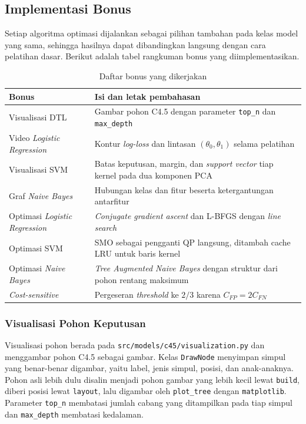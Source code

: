 \subsection{Implementasi Bonus}

Setiap algoritma optimasi dijalankan sebagai pilihan tambahan pada kelas
model yang sama, sehingga hasilnya dapat dibandingkan langsung dengan cara
pelatihan dasar. Berikut adalah tabel rangkuman bonus yang diimplementasikan.

\begin{table}[H]
\centering
\small
\caption{Daftar bonus yang dikerjakan}
\label{tab:bonus}
\begin{tabularx}{\textwidth}{@{}lX@{}}
\toprule
Bonus & Isi dan letak pembahasan \\
\midrule
Visualisasi DTL & Gambar pohon C4.5 dengan parameter \texttt{top\_n} dan \texttt{max\_depth} \\
Video \textit{Logistic Regression} & Kontur \textit{log-loss} dan lintasan $(\theta_0,\theta_1)$ selama pelatihan \\
Visualisasi SVM & Batas keputusan, margin, dan \textit{support vector} tiap kernel pada dua komponen PCA \\
Graf \textit{Naive Bayes} & Hubungan kelas dan fitur beserta ketergantungan antarfitur \\
Optimasi \textit{Logistic Regression} & \textit{Conjugate gradient ascent} dan L-BFGS dengan \textit{line search} \\
Optimasi SVM & SMO \cite{ref:platt-1998} sebagai pengganti QP langsung, ditambah cache LRU untuk baris kernel \\
Optimasi \textit{Naive Bayes} & \textit{Tree Augmented Naive Bayes} dengan struktur dari pohon rentang maksimum \\
\textit{Cost-sensitive} & Pergeseran \textit{threshold} ke $2/3$ karena $C_{FP}=2C_{FN}$ \\
\bottomrule
\end{tabularx}
\end{table}

\subsubsection{Visualisasi Pohon Keputusan}

Visualisasi pohon berada pada \texttt{src/models/c45/visualization.py} dan
menggambar pohon C4.5 sebagai gambar. Kelas \texttt{DrawNode} menyimpan simpul
yang benar-benar digambar, yaitu label, jenis simpul, posisi, dan anak-anaknya.
Pohon asli lebih dulu disalin menjadi pohon gambar yang lebih kecil lewat
\texttt{build}, diberi posisi lewat \texttt{layout}, lalu digambar oleh
\texttt{plot\_tree} dengan \texttt{matplotlib}. Parameter \texttt{top\_n}
membatasi jumlah cabang yang ditampilkan pada tiap simpul dan
\texttt{max\_depth} membatasi kedalaman.

